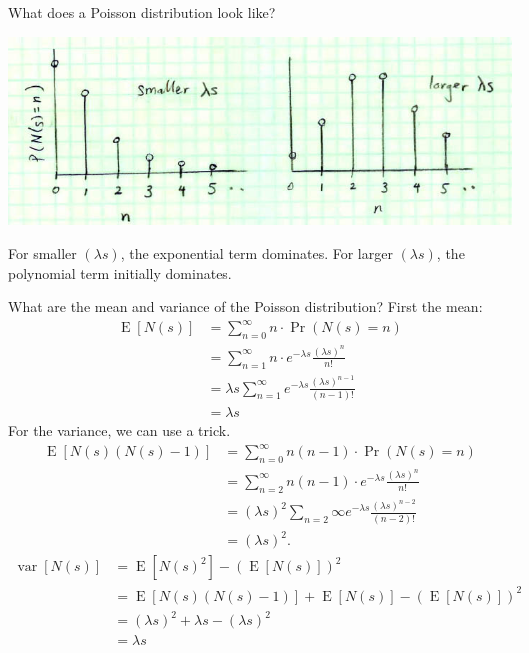 \documentclass[11pt]{article}
\DeclareMathOperator{\E}{E}
\DeclareMathOperator{\var}{var}
\begin{document}
What does a Poisson distribution look like? 

\begin{center}
\includegraphics[scale=0.5]{Figure4.jpg}
\end{center}


For smaller $(\lambda s)$, the exponential term dominates. For larger
$(\lambda s)$, the polynomial term initially dominates.

What are the mean and variance of the Poisson distribution? First the mean:
\begin{equation}
\begin{split}
\E\left[ N(s)\right] &= \sum_{n=0}^{\infty} n \cdot \Pr\left(N(s) = n\right) \\
  &= \sum_{n=1}^{\infty} n \cdot e^{-\lambda s} \frac{(\lambda s)^n}{n!} \\
  &= \lambda s \sum_{n=1}^{\infty} e^{-\lambda s} \frac{ (\lambda s)^{n-1} }{(n-1)!} \\
  &= \boxed{\lambda s}
\end{split}
\end{equation}
For the variance, we can use a trick.
\begin{equation}
\begin{split}
\E\left[ N(s) \left(N(s) - 1\right)\right] &= \sum_{n=0}^{\infty} n (n-1) \cdot \Pr\left(N(s) = n\right) \\
  &= \sum_{n=2}^{\infty} n (n - 1) \cdot e^{-\lambda s} \frac{(\lambda s)^n}{n!} \\
  &= (\lambda s)^2 \sum_{n=2}{\infty} e^{-\lambda s} \frac{ (\lambda s)^{n-2} }{(n-2)!} \\
  &= (\lambda s)^2.
\end{split}
\end{equation}
\begin{equation}
\begin{split}
\var\left[ N(s) \right] &= \E\left[N(s)^2\right] - \left(\E\left[N(s)\right]\right)^2 \\
  &= \E\left[ N(s) \left( N(s) - 1\right)\right] + \E\left[ N(s) \right] - \left(\E\left[N(s)\right]\right)^2 \\
  &= (\lambda s)^2 + \lambda s - (\lambda s)^2 \\
  &= \boxed{\lambda s}
\end{split}
\end{equation}
\end{document}
